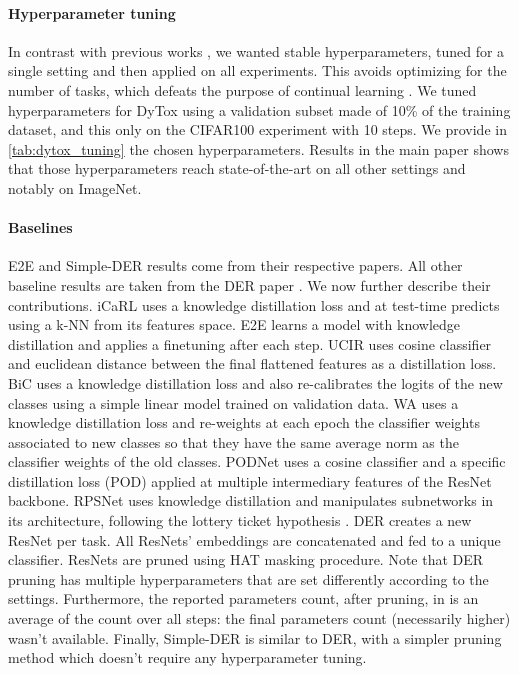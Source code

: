 \paragraph{Hyperparameter tuning} In contrast with previous works
\cite{douillard2020podnet,yan2021der}, we wanted stable hyperparameters, tuned for a single setting
and then applied on all experiments. This avoids optimizing for the number of tasks, which defeats
the purpose of continual learning \cite{farquhar2018robustcontinual}. We tuned hyperparameters for
DyTox using a validation subset made of 10\% of the training dataset, and this only on the CIFAR100
experiment with 10 steps. We provide in \autoref{tab:dytox_tuning} the chosen hyperparameters. Results in
the main paper shows that those hyperparameters reach state-of-the-art on all other settings and
notably on ImageNet.



\paragraph{Baselines} E2E \cite{castro2018end_to_end_inc_learn} and Simple-DER \cite{li2021preserve}
results come from their respective papers. All other baseline results are taken from the DER paper
\cite{yan2021der}. We now further describe their contributions. iCaRL \cite{rebuffi2017icarl} uses a
knowledge distillation loss \cite{hinton2015knowledge_distillation} and at test-time predicts using
a k-NN from its features space. E2E \cite{castro2018end_to_end_inc_learn} learns a model with
knowledge distillation and applies a finetuning after each step. UCIR \cite{hou2019ucir} uses cosine
classifier and euclidean distance between the final flattened features as a distillation loss. BiC
\cite{wu2019bias_correction} uses a knowledge distillation loss and also re-calibrates
\cite{guo2017miscalibration} the logits of the new classes using a simple linear model trained on
validation data. WA \cite{zhao2020weightalignement} uses a knowledge distillation loss and
re-weights at each epoch the classifier weights associated to new classes so that they have the same
average norm as the classifier weights of the old classes. PODNet \cite{douillard2020podnet} uses a
cosine classifier and a specific distillation loss (POD) applied at multiple intermediary features
of the ResNet backbone. RPSNet \cite{rajasegaran2019rpsnet} uses knowledge distillation and
manipulates subnetworks in its architecture, following the lottery ticket hypothesis
\cite{frankle2019lottery_ticket}. DER \cite{yan2021der} creates a new ResNet per task. All ResNets'
embeddings are concatenated and fed to a unique classifier. ResNets are pruned using HAT
\cite{serra2018hat} masking procedure. Note that DER pruning has multiple hyperparameters that are
set differently according to the settings. Furthermore, the reported parameters count, after
pruning, in \cite{yan2021der} is an average of the count over all steps: the final parameters count
(necessarily higher) wasn't available. Finally, Simple-DER \cite{li2021preserve} is similar to DER,
with a simpler pruning method which doesn't require any hyperparameter tuning.

